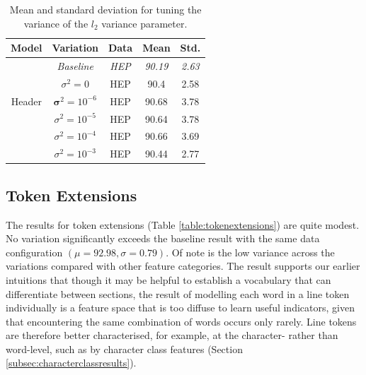 \begin{table}[h]
\begin{center}
\begin{tabular}{|c|c|c|c|c|}
\hline
Model & Variation & Data & Mean & Std.\\
\hline
\multirow{5}{*}{Header} & \emph{Baseline} & \emph{HEP} & \emph{90.19} & \emph{2.63} \\\cline{2-5}
& $\sigma^2 = 0$ & HEP & 90.4 & 2.58\\\cline{2-5}
& $\mathbf \sigma^2 = 10^{-6}$ & HEP & 90.68 & 3.78\\\cline{2-5}
& $\sigma^2 = 10^{-5}$ & HEP & 90.64 & 3.78\\\cline{2-5}
& $\sigma^2 = 10^{-4}$ & HEP & 90.66 & 3.69\\\cline{2-5}
& $\sigma^2 = 10^{-3}$ & HEP & 90.44 & 2.77\\\cline{2-5}
\hline
\end{tabular}
\caption{Mean and standard deviation for tuning the variance of the $l_2$ variance parameter.}
\label{table:regularisationresults}
\end{center}
\end{table}

\subsection{Token Extensions}
\label{subsec:tokenextensionresults}

The results for token extensions (Table \ref{table:tokenextensions}) are quite modest. No variation significantly exceeds the baseline result with the same data configuration $(\mu = 92.98, \sigma = 0.79)$. Of note is the low variance across the variations compared with other feature categories. The result supports our earlier intuitions that though it may be helpful to establish a vocabulary that can differentiate between sections, the result of modelling each word in a line token individually is a feature space that is too diffuse to learn useful indicators, given that encountering the same combination of words occurs only rarely. Line tokens are therefore better characterised, for example, at the character- rather than word-level, such as by character class features (Section \ref{subsec:characterclassresults}).

